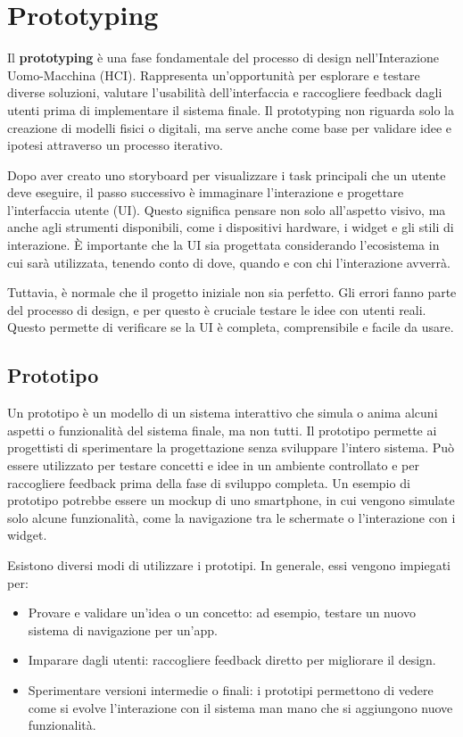 \chapter{Prototyping}
\begin{redbar}
Il \textbf{prototyping} è una fase fondamentale del processo di design nell'Interazione Uomo-Macchina (HCI). Rappresenta un'opportunità per esplorare e testare diverse soluzioni, valutare l'usabilità dell'interfaccia e raccogliere feedback dagli utenti prima di implementare il sistema finale. Il prototyping non riguarda solo la creazione di modelli fisici o digitali, ma serve anche come base per validare idee e ipotesi attraverso un processo iterativo.
\end{redbar}

Dopo aver creato uno storyboard per visualizzare i task principali che un utente deve eseguire, il passo successivo è immaginare l'interazione e progettare l'interfaccia utente (UI). Questo significa pensare non solo all'aspetto visivo, ma anche agli strumenti disponibili, come i dispositivi hardware, i widget e gli stili di interazione. È importante che la UI sia progettata considerando l'ecosistema in cui sarà utilizzata, tenendo conto di dove, quando e con chi l'interazione avverrà.

Tuttavia, è normale che il progetto iniziale non sia perfetto. Gli errori fanno parte del processo di design, e per questo è cruciale testare le idee con utenti reali. Questo permette di verificare se la UI è completa, comprensibile e facile da usare.

\section{Prototipo}
Un prototipo è un modello di un sistema interattivo che simula o anima alcuni aspetti o funzionalità del sistema finale, ma non tutti. Il prototipo permette ai progettisti di sperimentare la progettazione senza sviluppare l'intero sistema. Può essere utilizzato per testare concetti e idee in un ambiente controllato e per raccogliere feedback prima della fase di sviluppo completa. Un esempio di prototipo potrebbe essere un mockup di uno smartphone, in cui vengono simulate solo alcune funzionalità, come la navigazione tra le schermate o l’interazione con i widget.

Esistono diversi modi di utilizzare i prototipi. In generale, essi vengono impiegati per:
\begin{itemize}
    \item Provare e validare un'idea o un concetto: ad esempio, testare un nuovo sistema di navigazione per un'app.
    \item Imparare dagli utenti: raccogliere feedback diretto per migliorare il design.
    \item Sperimentare versioni intermedie o finali: i prototipi permettono di vedere come si evolve l'interazione con il sistema man mano che si aggiungono nuove funzionalità.
\end{itemize}

